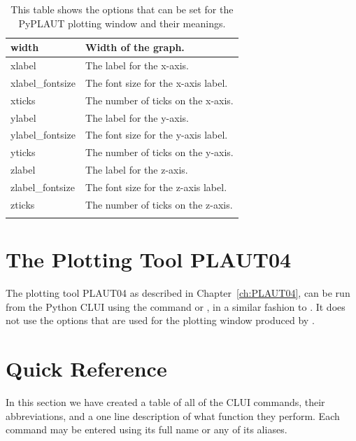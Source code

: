 \documentclass[12pt]{report}
\begin{document}
\begin{longtable}{| l | l |}
 \hline
 width  & Width of the graph. \\
 \hline
 xlabel  & The label for the x-axis. \\
 \hline
 xlabel\_fontsize  & The font size for the x-axis label. \\
 \hline
 xticks  & The number of ticks on the x-axis. \\
 \hline
 ylabel  & The label for the y-axis. \\
 \hline
 ylabel\_fontsize  & The font size for the y-axis label. \\
 \hline
 yticks  & The number of ticks on the y-axis. \\
 \hline
 zlabel  & The label for the z-axis. \\
 \hline
 zlabel\_fontsize  & The font size for the z-axis label. \\
 \hline
 zticks  & The number of ticks on the z-axis. \\
 \hline
 \caption[The options for the PyPLAUT plotting window.]
 {This table shows the options that
 can be set for the PyPLAUT plotting window and their meanings.}
 \label{tbl:clui plotter specific options}
 \end{longtable}

 \section{ The Plotting Tool PLAUT04}

 The \AUTO plotting tool {\cal PLAUT04} as described
 in Chapter~\ref{ch:PLAUT04}, can be run from the Python CLUI
 using the command
  or , in a similar
 fashion to . It does not use the options that
 are used for the plotting window produced by .

 \section{ Quick Reference } \label{sec:clui quick reference}

 In this section we have created a table of all of the \AUTO CLUI
 commands, their abbreviations, and a one line description of what
 function they perform.  Each command may be entered using 
 its full name or any of its aliases.
\end{document}

